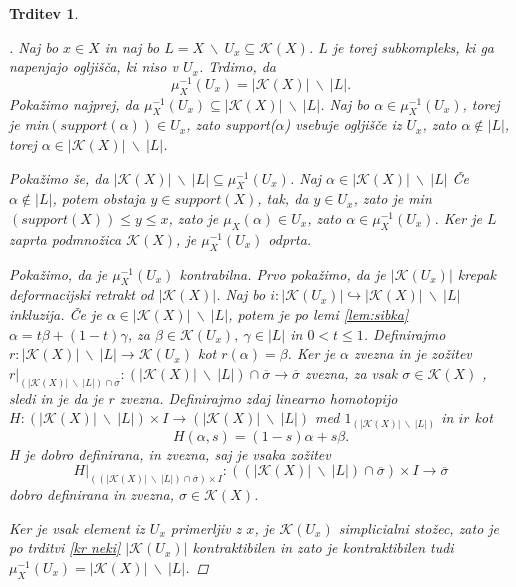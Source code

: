 \documentclass[a4paper,12pt]{article}
\DeclareRobustCommand{\k}{
    \mathcal{K}
}
\theoremstyle{definition}
\theoremstyle{plain}
\theoremstyle{definition}
\theoremstyle{plain}
\newtheorem{trditev}{Trditev}
\theoremstyle{plain}
\theoremstyle{plain}
\theoremstyle{plain}
\newenvironment{dokaz}{\begin{proof}[\bfseries\upshape\proofname]}{\end{proof}}
\begin{document}
\begin{trditev}
\begin{dokaz}
    Naj bo $x\in X$ in naj bo $L=X\ \backslash \
    U_x\subseteq \mathcal{K}(X)$. $L$ je torej 
    subkompleks, ki ga napenjajo ogljišča, ki niso v $U_x$. 
    Trdimo, da 
    $$
    \mu_X^{-1}(U_x)=|\mathcal{K}(X)|\ \backslash \ |L|.
    $$
    Pokažimo najprej, da $\mu_X^{-1}(U_x)\subseteq 
    |\mathcal{K}(X)|\ \backslash \ |L|$. Naj bo $\alpha \in 
    \mu_X^{-1}(U_x)$, torej je min$(\textit{support}
    (\alpha))\in U_x$, zato \textit{support}($\alpha$) vsebuje 
    ogljišče iz $U_x$, zato $\alpha \notin |L|$, torej $\alpha 
    \in |\mathcal{K}(X)|\ \backslash \ |L|$.

    Pokažimo še, da $|\mathcal{K}(X)|\ \backslash \
    |L|\subseteq \mu_X^{-1}(U_x)$. Naj $\alpha \in |\mathcal{K}(X)|\ \backslash \ |L|$
    Če  $\alpha \notin |L|$, potem obstaja $y\in 
    \textit{support}(X)$, tak, da $y \in U_x$, zato je 
    min$(\textit{support}(X))\leq y \leq x$, zato je 
    $\mu_X(\alpha) \in U_x$, zato $\alpha \in \mu_X^{-1}
    (U_x)$.
    Ker je $L$ zaprta podmnožica $\mathcal{K}(X)$, je 
    $\mu_X^{-1}(U_x)$ odprta.

    Pokažimo, da je $\mu_X^{-1}(U_x)$ kontrabilna. Prvo pokažimo, da je 
    $|\mathcal{K}(U_x)|$ krepak deformacijski retrakt 
    od $|\mathcal{K}(X)|$. Naj bo $i:|\k(U_x)|\hookrightarrow |\mathcal{K}
    (X)|\ \backslash \ |L|$ inkluzija. Če je $\alpha \in |\mathcal{K}(X)|\ 
    \backslash \ |L|$, potem je po lemi \ref{lem:sibka}  $\alpha = t\beta + 
    (1-t)\gamma$, za $\beta \in \k(U_x), \ \gamma \in |L|$ in $0<t\leq 1$. 
    Definirajmo $r:|\mathcal{K}(X)|\ \backslash \ |L|\rightarrow \k(U_x)$ 
    kot $r(\alpha)=\beta$. Ker je $\alpha$ zvezna in je zožitev $r|_{(|\mathcal{K}(X)|\ \backslash \ |L|)\cap 
    \overline{\sigma}}:(|\mathcal{K}(X)|\ \backslash \ |L|)\cap 
    \overline{\sigma} \rightarrow \overline{\sigma}$ zvezna, za vsak 
    $\sigma \in \k(X)$ , sledi in je da je $r$ zvezna. Definirajmo zdaj linearno homotopijo $H:(|\mathcal{K}(X)|\ \backslash \ |L|) \times I \rightarrow (|\mathcal{K}(X)|\ \backslash \ |L|)$ med $1_{(|\mathcal{K}(X)|\ \backslash \ |L|)}$ in $ir$ kot 
    $$
    H(\alpha,s)=(1-s)\alpha + s\beta.
    $$
    H je dobro definirana, in zvezna, saj je vsaka zožitev 
    $$
    H|_{((|\mathcal{K}(X)|\ \backslash \ |L|)\cap 
    \overline{\sigma})\times I}:((|\mathcal{K}(X)|\ \backslash \ |L|)\cap 
    \overline{\sigma})\times I \rightarrow \overline{\sigma}
    $$
    dobro definirana in zvezna, $\sigma \in \k(X)$.

    Ker je vsak element iz $U_x$ primerljiv z $x$, je $\k(U_x)$ 
    simplicialni stožec, zato je po trditvi \ref{kr neki} $|\k(U_x)|$ 
    kontraktibilen in zato je kontraktibilen tudi $\mu_X^{-1}
    (U_x)=|\mathcal{K}(X)|\ \backslash \ |L|$.
\end{dokaz}



\end{trditev}
\end{document}
